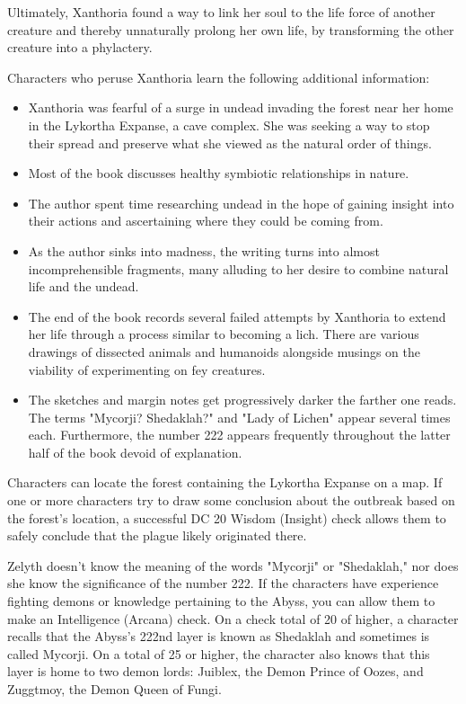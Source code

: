 \documentclass[10pt,a4paper,twoside,bg=print,twocolumn,openany,nodeprecatedcode]{dndbook}
\begin{document}
Ultimately, Xanthoria found a way to link her soul to the life force of another creature and thereby unnaturally prolong her own life, by transforming the other creature into a phylactery.

Characters who peruse Xanthoria learn the following additional information:


\begin{itemize}
\item Xanthoria was fearful of a surge in undead invading the forest near her home in the Lykortha Expanse, a cave complex. She was seeking a way to stop their spread and preserve what she viewed as the natural order of things.
\item Most of the book discusses healthy symbiotic relationships in nature.
\item The author spent time researching undead in the hope of gaining insight into their actions and ascertaining where they could be coming from.
\item As the author sinks into madness, the writing turns into almost incomprehensible fragments, many alluding to her desire to combine natural life and the undead.
\item The end of the book records several failed attempts by Xanthoria to extend her life through a process similar to becoming a lich. There are various drawings of dissected animals and humanoids alongside musings on the viability of experimenting on fey creatures.
\item The sketches and margin notes get progressively darker the farther one reads. The terms "Mycorji? Shedaklah?" and "Lady of Lichen" appear several times each. Furthermore, the number 222 appears frequently throughout the latter half of the book devoid of explanation.
\end{itemize}

Characters can locate the forest containing the Lykortha Expanse on a map. If one or more characters try to draw some conclusion about the outbreak based on the forest's location, a successful DC 20 Wisdom (Insight) check allows them to safely conclude that the plague likely originated there.

Zelyth doesn't know the meaning of the words "Mycorji" or "Shedaklah," nor does she know the significance of the number 222. If the characters have experience fighting demons or knowledge pertaining to the Abyss, you can allow them to make an Intelligence (Arcana) check. On a check total of 20 of higher, a character recalls that the Abyss's 222nd layer is known as Shedaklah and sometimes is called Mycorji. On a total of 25 or higher, the character also knows that this layer is home to two demon lords: Juiblex, the Demon Prince of Oozes, and Zuggtmoy, the Demon Queen of Fungi.
\end{document}
